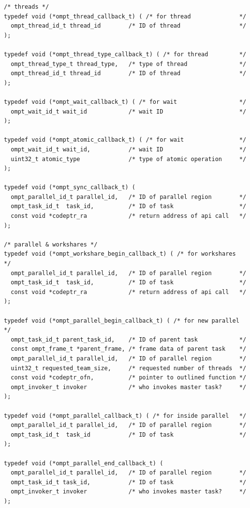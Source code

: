 \documentclass{article}
\begin{document}
{\begin{verbatim}
/* threads */	
typedef void (*ompt_thread_callback_t) ( /* for thread              */	   
  ompt_thread_id_t thread_id        /* ID of thread                 */
);

typedef void (*ompt_thread_type_callback_t) ( /* for thread         */
  ompt_thread_type_t thread_type,   /* type of thread               */	   
  ompt_thread_id_t thread_id        /* ID of thread                 */
);
	
typedef void (*ompt_wait_callback_t) ( /* for wait                  */
  ompt_wait_id_t wait_id            /* wait ID                      */
);

typedef void (*ompt_atomic_callback_t) ( /* for wait                */
  ompt_wait_id_t wait_id,           /* wait ID                      */
  uint32_t atomic_type              /* type of atomic operation     */
);

typedef void (*ompt_sync_callback_t) ( 			   
  ompt_parallel_id_t parallel_id,   /* ID of parallel region        */
  ompt_task_id_t  task_id,          /* ID of task                   */
  const void *codeptr_ra            /* return address of api call   */
);

/* parallel & workshares */									    
typedef void (*ompt_workshare_begin_callback_t) ( /* for workshares   */			   
  ompt_parallel_id_t parallel_id,   /* ID of parallel region        */
  ompt_task_id_t  task_id,          /* ID of task                   */
  const void *codeptr_ra            /* return address of api call   */
);								    
							   	    
typedef void (*ompt_parallel_begin_callback_t) ( /* for new parallel  */
  ompt_task_id_t parent_task_id,    /* ID of parent task            */
  const ompt_frame_t *parent_frame, /* frame data of parent task    */
  ompt_parallel_id_t parallel_id,   /* ID of parallel region        */
  uint32_t requested_team_size,     /* requested number of threads  */
  const void *codeptr_ofn,          /* pointer to outlined function */
  ompt_invoker_t invoker            /* who invokes master task?     */
);

typedef void (*ompt_parallel_callback_t) ( /* for inside parallel   */			   
  ompt_parallel_id_t parallel_id,   /* ID of parallel region        */
  ompt_task_id_t  task_id           /* ID of task                   */
);

typedef void (*ompt_parallel_end_callback_t) (
  ompt_parallel_id_t parallel_id,   /* ID of parallel region        */
  ompt_task_id_t task_id,           /* ID of task                   */
  ompt_invoker_t invoker            /* who invokes master task?     */
);
			   		

\end{verbatim}}
\end{document}
